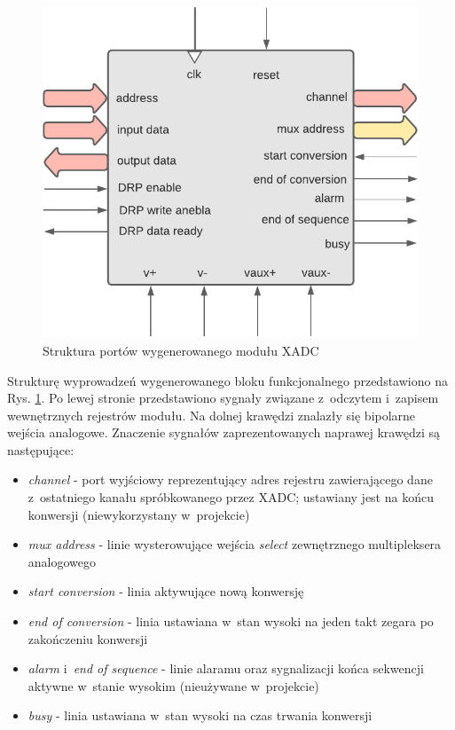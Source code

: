 \vspace{0.5cm}
\begin{figure}[ht]
    \centering
    \includegraphics[scale=0.8]{img/diagrams/xadc.pdf}
    \captionsetup{format=plain,justification=centering}
    \caption{Struktura portów wygenerowanego modułu XADC}
    \label{xadc-structure}
\end{figure}
\vspace{0.5cm}

Strukturę wyprowadzeń wygenerowanego bloku funkcjonalnego przedstawiono na Rys. \ref{xadc-structure}. Po lewej stronie przedstawiono sygnały związane z~odczytem i~zapisem wewnętrznych rejestrów modułu. Na dolnej krawędzi znalazły się bipolarne wejścia analogowe. Znaczenie sygnałów zaprezentowanych naprawej krawędzi są następujące:

\begin{itemize}
    \item \textit{channel} - port wyjściowy reprezentujący adres rejestru zawierającego dane z~ostatniego kanału spróbkowanego przez XADC; ustawiany jest na końcu konwersji (niewykorzystany w~projekcie)
    \item \textit{mux address} - linie wysterowujące wejścia \textit{select} zewnętrznego multipleksera analogowego
    \item \textit{start conversion} - linia aktywujące nową konwersję
    \item \textit{end of conversion} - linia ustawiana w~stan wysoki na jeden takt zegara po zakończeniu konwersji
    \item \textit{alarm} i~\textit{end of sequence} - linie alaramu oraz sygnalizacji końca sekwencji aktywne w~stanie wysokim (nieużywane w~projekcie)
    \item \textit{busy} - linia ustawiana w~stan wysoki na czas trwania konwersji
\end{itemize}


